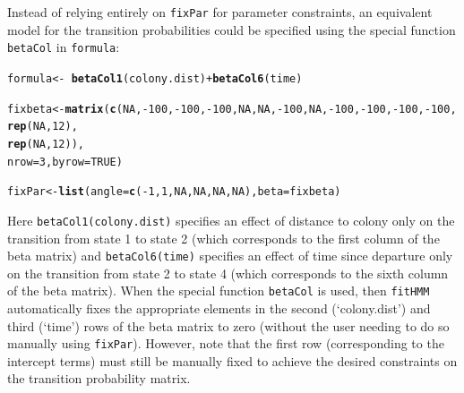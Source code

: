 \documentclass[12pt]{article}\usepackage[]{graphicx}\usepackage[]{xcolor}
\makeatletter
\newcommand{\hlnum}[1]{\textcolor[rgb]{0.686,0.059,0.569}{#1}}%
\newcommand{\hlopt}[1]{\textcolor[rgb]{0,0,0}{#1}}%
\newcommand{\hldef}[1]{\textcolor[rgb]{0.345,0.345,0.345}{#1}}%
\newcommand{\hlkwb}[1]{\textcolor[rgb]{0.69,0.353,0.396}{#1}}%
\newcommand{\hlkwc}[1]{\textcolor[rgb]{0.333,0.667,0.333}{#1}}%
\newcommand{\hlkwd}[1]{\textcolor[rgb]{0.737,0.353,0.396}{\textbf{#1}}}%
\newenvironment{kframe}{%
 \def\at@end@of@kframe{}%
 \ifinner\ifhmode%
  \def\at@end@of@kframe{\end{minipage}}%
  \begin{minipage}{\columnwidth}%
 \fi\fi%
 \def\FrameCommand##1{\hskip\@totalleftmargin \hskip-\fboxsep
 \colorbox{shadecolor}{##1}\hskip-\fboxsep
     \hskip-\linewidth \hskip-\@totalleftmargin \hskip\columnwidth}%
 \MakeFramed {\advance\hsize-\width
   \@totalleftmargin\z@ \linewidth\hsize
   \@setminipage}}%
 {\par\unskip\endMakeFramed%
 \at@end@of@kframe}
\newenvironment{knitrout}{}{} %
\makeatother
\begin{document}
Instead of relying entirely on \verb|fixPar| for parameter constraints, an equivalent model for the transition probabilities could be specified using the special function \verb|betaCol| in \verb|formula|:
\begin{knitrout}
\color{fgcolor}\begin{kframe}
\begin{alltt}
\hldef{formula} \hlkwb{<-} \hlopt{~} \hlkwd{betaCol1}\hldef{(colony.dist)} \hlopt{+} \hlkwd{betaCol6}\hldef{(time)}

\hldef{fixbeta} \hlkwb{<-} \hlkwd{matrix}\hldef{(}\hlkwd{c}\hldef{(}\hlnum{NA}\hldef{,}\hlopt{-}\hlnum{100}\hldef{,}\hlopt{-}\hlnum{100}\hldef{,}\hlopt{-}\hlnum{100}\hldef{,}\hlnum{NA}\hldef{,}\hlnum{NA}\hldef{,}\hlopt{-}\hlnum{100}\hldef{,}\hlnum{NA}\hldef{,}\hlopt{-}\hlnum{100}\hldef{,}\hlopt{-}\hlnum{100}\hldef{,}\hlopt{-}\hlnum{100}\hldef{,}\hlopt{-}\hlnum{100}\hldef{,}
                    \hlkwd{rep}\hldef{(}\hlnum{NA}\hldef{,}\hlnum{12}\hldef{),}
                    \hlkwd{rep}\hldef{(}\hlnum{NA}\hldef{,}\hlnum{12}\hldef{)),}
                  \hlkwc{nrow}\hldef{=}\hlnum{3}\hldef{,}\hlkwc{byrow}\hldef{=}\hlnum{TRUE}\hldef{)}

\hldef{fixPar} \hlkwb{<-} \hlkwd{list}\hldef{(}\hlkwc{angle}\hldef{=}\hlkwd{c}\hldef{(}\hlopt{-}\hlnum{1}\hldef{,}\hlnum{1}\hldef{,}\hlnum{NA}\hldef{,}\hlnum{NA}\hldef{,}\hlnum{NA}\hldef{,}\hlnum{NA}\hldef{),}\hlkwc{beta}\hldef{=fixbeta)}
\end{alltt}
\end{kframe}
\end{knitrout}
Here \verb|betaCol1(colony.dist)| specifies an effect of distance to colony only on the transition from state 1 to state 2 (which corresponds to the first column of the beta matrix) and \verb|betaCol6(time)| specifies an effect of time since departure only on the transition from state 2 to state 4 (which corresponds to the sixth column of the beta matrix).  When the special function \verb|betaCol| is used, then \verb|fitHMM| automatically fixes the appropriate elements in the second (`colony.dist') and third (`time') rows of the beta matrix to zero (without the user needing to do so manually using \verb|fixPar|). However, note that the first row (corresponding to the intercept terms) must still be manually fixed to achieve the desired constraints on the transition probability matrix.
\end{document}
